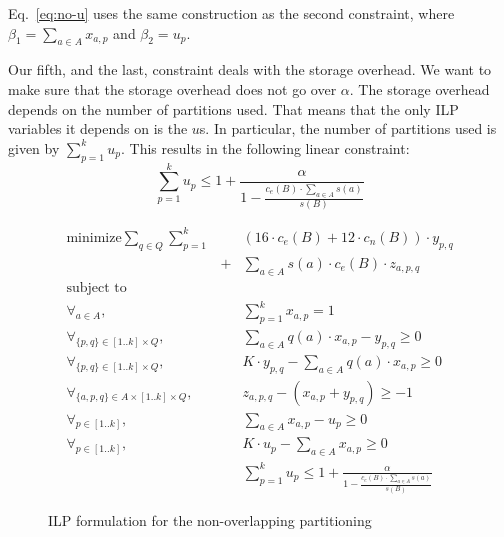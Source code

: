 Eq.~\ref{eq:no-u} uses the same construction as the second constraint, where
$\beta_1=\sum_{a\in A} x_{a,p}$ and $\beta_2=u_p$.

Our fifth, and the last, constraint deals with the storage overhead. We want to
 make sure that the storage overhead does not go over $\alpha$. The storage
overhead depends on the number of partitions used. That means that the only 
ILP variables it depends on is the $u$s. In particular, the number of
partitions used is given by $\sum_{p=1}^{k} u_p$. This results in the
following linear constraint:
\begin{equation}
\sum_{p=1}^{k} u_p \leq 1 + \frac{\alpha}
  {1-\frac{c_e(B)\cdot \sum_{a\in A} s(a)}{s(B)}}
\end{equation}

\begin{figure}[!t]
\begin{mdframed}
\begin{eqnarray}
\text{minimize}  
    \sum_{q\in Q} \sum_{p=1}^{k} \!\!&&\!\! (16\cdot c_e(B) + 12\cdot c_n(B))\cdot y_{p,q}\nonumber\\
    &+& \sum_{a\in A} s(a)\cdot c_e(B)\cdot z_{a,p,q} \nonumber\\
\text{subject to}&&\nonumber\\
\forall_{a\in A}, 
    && \sum_{p=1}^{k} x_{a,p} = 1\nonumber\\
\forall_{\{p,q\}\in [1..k]\times Q}, 
    &&  \sum_{a\in A} q(a)\cdot x_{a,p} - y_{p,q} \geq 0 \nonumber\\
\forall_{\{p,q\}\in [1..k]\times Q}, 
    &&  K\cdot y_{p,q} - \sum_{a\in A} q(a)\cdot x_{a,p}  \geq 0 \nonumber\\
\forall_{\{a,p,q\}\in A\times [1..k]\times Q},
    && z_{a,p,q} - (x_{a,p} + y_{p,q}) \geq -1\nonumber\\
\forall_{p\in[1..k]},
    && \sum_{a\in A} x_{a,p} - u_p \geq 0 \nonumber\\
\forall_{p\in[1..k]},
    && K\cdot u_p - \sum_{a\in A} x_{a,p} \geq 0 \nonumber\\    
&& \sum_{p=1}^{k} u_p \leq 1 + \frac{\alpha}
  {1-\frac{c_e(B)\cdot \sum_{a\in A} s(a)}{s(B)}} \nonumber
\end{eqnarray}
\end{mdframed}
\caption{ILP formulation for the non-overlapping partitioning}
\label{fig:nov-ilp}
\end{figure}

